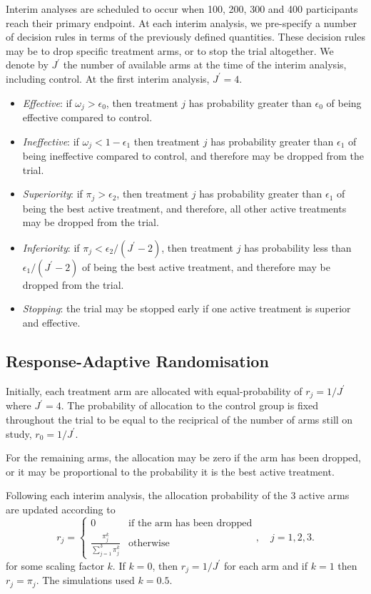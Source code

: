 \documentclass[11pt,parskip=half-]{scrartcl}
\begin{document}
Interim analyses are scheduled to occur when 100, 200, 300 and 400 participants reach their primary endpoint. At each interim analysis, we pre-specify a number of decision rules in terms of the previously defined quantities. These decision rules may be to drop specific treatment arms, or to stop the trial altogether. We denote by $J^\prime$ the number of available arms at the time of the interim analysis, including control. At the first interim analysis, $J^\prime=4$.

\begin{itemize}
  \item \textit{Effective}: if $\omega_j > \epsilon_0$, then treatment $j$ has probability greater than $\epsilon_0$ of being effective compared to control.
  \item \textit{Ineffective}: if $\omega_j < 1-\epsilon_1$ then treatment $j$ has probability greater than $\epsilon_1$ of being ineffective compared to control, and therefore may be dropped from the trial.
  \item \textit{Superiority}: if $\pi_j > \epsilon_2$, then treatment $j$ has probability greater than $\epsilon_1$ of being the best active treatment, and therefore, all other active treatments may be dropped from the trial.
  \item \textit{Inferiority}: if $\pi_j < \epsilon_2/(J^\prime-2)$, then treatment $j$ has probability less than $\epsilon_1/(J^\prime-2)$ of being the best active treatment, and therefore may be dropped from the trial.
  \item \textit{Stopping}: the trial may be stopped early if one active treatment is superior and effective.
\end{itemize}

\subsection*{Response-Adaptive Randomisation}

Initially, each treatment arm are allocated with equal-probability of $r_j=1/J^\prime$ where $J^\prime=4$. The probability of allocation to the control group is fixed throughout the trial to be equal to the reciprical of the number of arms still on study, $r_0 = 1/J^\prime$.

For the remaining arms, the allocation may be zero if the arm has been dropped, or it may be proportional to the probability it is the best active treatment.

Following each interim analysis, the allocation probability of the 3 active arms are updated according to
$$
  r_j = \begin{cases}
    0                                   & \text{if the arm has been dropped} \\
    \frac{\pi_j^k}{\sum_{j=1}^3\pi_j^k} & \text{otherwise}
  \end{cases},\quad j=1,2,3.
$$
for some scaling factor $k$. If $k=0$, then $r_j = 1/J^\prime$ for each arm and if $k=1$ then $r_j = \pi_j$. The simulations used $k=0.5$.
\end{document}

